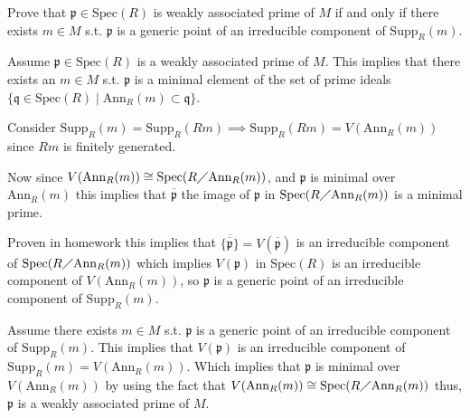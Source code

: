 \documentclass[12pt, letterpaper]{article}
\newcommand{\p}{\mathfrak{p}}
\newcommand{\Spec}{\mathrm{Spec}}
\newcommand{\Supp}{\mathrm{Supp}}
\newcommand{\Ann}{\mathrm{Ann}}
\newcommand{\mf}[1]{\mathfrak{#1}}
\begin{document}
\qh[]
\begin{subproblem}{}
    Prove that $\p \in \Spec(R)$ is weakly associated prime of $M$ if and only if  there exists $m \in M$ s.t. $\p$ is a generic point of an irreducible component of $\Supp_R(m)$.
\end{subproblem}
\begin{problemproof}
    Assume $\p \in \Spec(R)$ is a weakly associated prime of $M$. This implies that there exists an $m \in M$ s.t. $\p$ is a minimal element of the set of prime ideals $\{\mf{q} \in \Spec(R) \mid \Ann_R(m) \subset \mf{q}\}$.

    Consider $\Supp_R(m) = \Supp_R(Rm) \implies \Supp_R(Rm) = V(\Ann_R(m))$ since $Rm$ is finitely generated.

    Now since $V(\Ann_R(m)) \cong \Spec(R \diagup \Ann_R(m))$, and $\p$ is minimal over $\Ann_R(m)$ this implies that $\overline{\p}$ the image of $\p$ in $\Spec(R \diagup \Ann_R(m))$ is a minimal prime.

    Proven in homework this implies that $\overline{\{\overline{\p}\}}=V(\overline{\p})$ is an irreducible component of $\Spec(R \diagup \Ann_R(m))$ which implies $V(\p)$ in $\Spec(R)$ is an irreducible component of $V(\Ann_R(m))$,
    so $\p$ is a generic point of an irreducible component of $\Supp_R(m)$.

    Assume there exists $m \in M$ s.t. $\p$ is a generic point of an irreducible component of $\Supp_R(m)$. This implies that $V(\p)$ is an irreducible component of $\Supp_R(m)=V(\Ann_R(m))$. Which implies that $\p$ is minimal over $V(\Ann_R(m))$ by using the fact that $V(\Ann_R(m)) \cong \Spec(R \diagup \Ann_R(m))$ thus, $\p$ is a weakly
    associated prime of $M$.
\end{problemproof}
\end{document}
